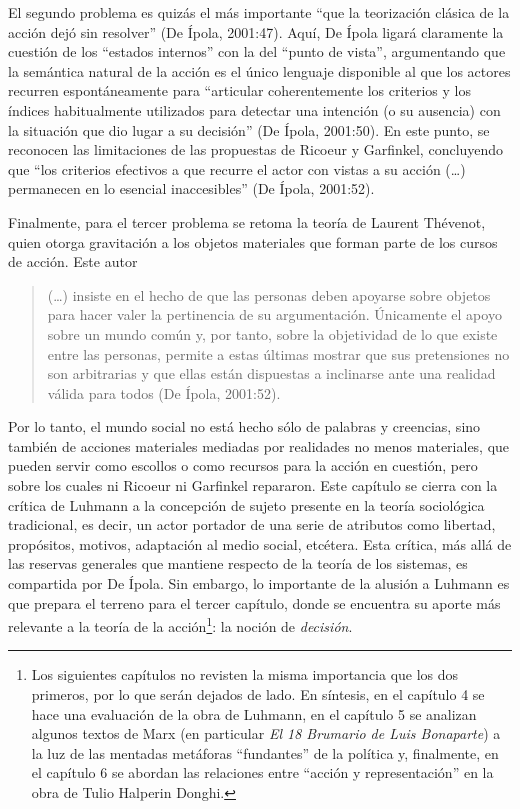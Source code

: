 El segundo problema es quizás el más importante ``que la teorización clásica de la acción dejó sin resolver'' (De Ípola, 2001:47). Aquí, De Ípola ligará claramente la cuestión de los ``estados internos'' con la del ``punto de vista'', argumentando que la semántica natural de la acción es el único lenguaje disponible al que los actores recurren espontáneamente para ``articular coherentemente los criterios y los índices habitualmente utilizados para detectar una intención (o su ausencia) con la situación que dio lugar a su decisión'' (De Ípola, 2001:50). En este punto, se reconocen las limitaciones de las propuestas de Ricoeur y Garfinkel, concluyendo que ``los criterios efectivos a que recurre el actor con vistas a su acción (\dots) permanecen en lo esencial inaccesibles'' (De Ípola, 2001:52).

Finalmente, para el tercer problema se retoma la teoría de Laurent Thévenot, quien otorga gravitación a los objetos materiales que forman parte de los cursos de acción. Este autor

\begin{quote}
(\dots) insiste en el hecho de que las personas deben apoyarse sobre objetos para hacer valer la pertinencia de su argumentación. Únicamente el apoyo sobre un mundo común y, por tanto, sobre la objetividad de lo que existe entre las personas, permite a estas últimas mostrar que sus pretensiones no son arbitrarias y que ellas están dispuestas a inclinarse ante una realidad válida para todos (De Ípola, 2001:52).
\end{quote}

Por lo tanto, el mundo social no está hecho sólo de palabras y creencias, sino también de acciones materiales mediadas por realidades no menos materiales, que pueden servir como escollos o como recursos para la acción en cuestión, pero sobre los cuales ni Ricoeur ni Garfinkel repararon. Este capítulo se cierra con la crítica de Luhmann a la concepción de sujeto presente en la teoría sociológica tradicional, es decir, un actor portador de una serie de atributos como libertad, propósitos, motivos, adaptación al medio social, etcétera. Esta crítica, más allá de las reservas generales que mantiene respecto de la teoría de los sistemas, es compartida por De Ípola. Sin embargo, lo importante de la alusión a Luhmann es que prepara el terreno para el tercer capítulo, donde se encuentra su aporte más relevante a la teoría de la acción\footnote{Los siguientes capítulos no revisten la misma importancia que los dos primeros, por lo que serán dejados de lado. En síntesis, en el capítulo 4 se hace una evaluación de la obra de Luhmann, en el capítulo 5 se analizan algunos textos de Marx (en particular \emph{El 18 Brumario de Luis Bonaparte}) a la luz de las mentadas metáforas ``fundantes'' de la política y, finalmente, en el capítulo 6 se abordan las relaciones entre ``acción y representación'' en la obra de Tulio Halperin Donghi.}: la noción de \emph{decisión}.

